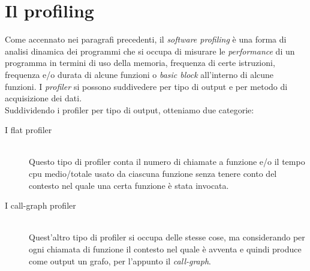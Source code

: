 \documentclass[a4paper,11pt]{report}
\begin{document}
\section{Il profiling}
Come accennato nei paragrafi precedenti, il \textit{software profiling} è una forma di analisi dinamica dei programmi che si occupa di misurare le \textit{performance} di un programma in termini di uso della memoria, frequenza di certe istruzioni, frequenza e/o durata di alcune funzioni o \textit{basic block} all'interno di alcune funzioni. I \textit{profiler} si possono suddivedere per tipo di output e per metodo di acquisizione dei dati. \\
Suddividendo i profiler per tipo di output, otteniamo due categorie:

\begin{description}
\item[I flat profiler] \hfill \\
Questo tipo di profiler conta il numero di chiamate a funzione e/o il tempo cpu medio/totale usato da ciascuna funzione senza tenere conto del contesto nel quale una certa funzione è stata invocata.
\item[I call-graph profiler] \hfill \\
Quest'altro tipo di profiler si occupa delle stesse cose, ma considerando per ogni chiamata di funzione il contesto nel quale è avventa e quindi produce come output un grafo, per l'appunto il \textit{call-graph}.
\end{description}
\end{document}
